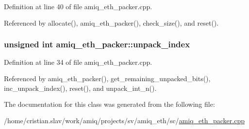 Definition at line 40 of file amiq\_\-eth\_\-packer.cpp.

Referenced by allocate(), amiq\_\-eth\_\-packer(), check\_\-size(), and reset().\hypertarget{classamiq__eth__packer_a04bf30a6893a4079fc1093af6dc999b9}{
\subsubsection[{unpack\_\-index}]{\setlength{\rightskip}{0pt plus 5cm}unsigned int {\bf amiq\_\-eth\_\-packer::unpack\_\-index}}}
\label{classamiq__eth__packer_a04bf30a6893a4079fc1093af6dc999b9}


Definition at line 34 of file amiq\_\-eth\_\-packer.cpp.

Referenced by amiq\_\-eth\_\-packer(), get\_\-remaining\_\-unpacked\_\-bits(), inc\_\-unpack\_\-index(), reset(), and unpack\_\-int\_\-n().

The documentation for this class was generated from the following file:\begin{DoxyCompactItemize}
\item 
/home/cristian.slav/work/amiq/projects/sv/amiq\_\-eth/sc/\hyperlink{amiq__eth__packer_8cpp}{amiq\_\-eth\_\-packer.cpp}\end{DoxyCompactItemize}

